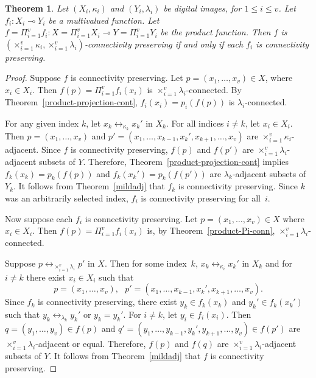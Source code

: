 \documentclass{article}
\theoremstyle{plain}
\newtheorem{thm}{Theorem}
\theoremstyle{definition}
\numberwithin{thm}{section}
\newcommand{\adj}{\leftrightarrow}
\begin{document}
\begin{thm}
Let $(X_i,\kappa_i)$ and $(Y_i,\lambda_i)$ be digital
images, for
$1 \le i \le v$. Let $f_i: X_i \multimap Y_i$ be a multivalued
function. Let $f = \Pi_{i=1}^v f_i: X=\Pi_{i=1}^v X_i \multimap Y=\Pi_{i=1}^v Y_i$ be the product 
function. Then $f$ is
$(\times_{i=1}^v \kappa_i,\times_{i=1}^v \lambda_i)$-connectivity preserving if and only if each $f_i$ is connectivity preserving.
\end{thm}

\begin{proof}
Suppose $f$ is connectivity preserving. Let $p = (x_1,\ldots,x_v) \in X$, where
$x_i \in X_i$. Then
$f(p)=\Pi_{i=1}^v f_i(x_i)$ is
$\times_{i=1}^v \lambda_i$-connected. By Theorem~\ref{product-projection-cont}, $f_i(x_i)=p_i(f(p))$ is
$\lambda_i$-connected.

For any given index $k$, let
$x_k \adj_{\kappa_k} x_k'$ in $X_k$. For all indices $i \neq k$,
let $x_i \in X_i$. Then 
$p=(x_1,\ldots,x_v)$ and
$p'=(x_1,\ldots,x_{k-1},x_k', x_{k+1}, \ldots, x_v)$ are
$\times_{i=1}^v \kappa_i$-adjacent.
Since $f$ is connectivity preserving,
$f(p)$ and $f(p')$ are
$\times_{i=1}^v \lambda_i$-adjacent
subsets of $Y$. Therefore,
Theorem~\ref{product-projection-cont} implies
$f_k(x_k)=p_k(f(p))$ and
$f_k(x_k')=p_k(f(p'))$ are
$\lambda_k$-adjacent
subsets of $Y_k$. It follows from
Theorem~\ref{mildadj} that $f_k$
is connectivity preserving. Since $k$ was an arbitrarily selected index,
$f_i$ is connectivity preserving for all~$i$.

Now suppose each $f_i$ is connectivity preserving. Let
$p=(x_1,\ldots,x_v) \in X$ where
$x_i \in X_i$. Then $f(p)=
\Pi_{i=1}^v f_i(x_i)$ is, by
Theorem~\ref{product-Pi-conn},
$\times_{i=1}^v \lambda_i$-connected.

Suppose $p \adj_{\times_{i=1}^v \lambda_i} p'$ in $X$. Then
for some index~$k$,
$x_k \adj_{\kappa_i} x_k'$
in $X_k$ and for $i \neq k$ there
exist $x_i \in X_i$ such that
\[ p=(x_1,\ldots,x_v),~~~
p'=(x_1,\ldots,x_{k-1}, x_k', x_{k+1}, \ldots,x_v).
\]
Since $f_k$ is connectivity preserving, there exist
$y_k \in f_k(x_k)$ and $y_k' \in f_k(x_k')$ such that 
$y_k \adj_{\lambda_k} y_k'$ or $y_k=y_k'$.
For $i \neq k$, let $y_i \in f_i(x_i)$. Then
$q=(y_1,\ldots,y_v) \in f(p)$ and
$q'=(y_1,\ldots,y_{k-1},y_k',y_{k+1},\ldots,y_v)  \in f(p')$ are $\times_{i=1}^v \lambda_i$-adjacent or equal. Therefore, $f(p)$ and $f(q)$ are
$\times_{i=1}^v \lambda_i$-adjacent
subsets of $Y$. It follows from
Theorem~\ref{mildadj} that $f$
is connectivity preserving.
\end{proof}
\end{document}
